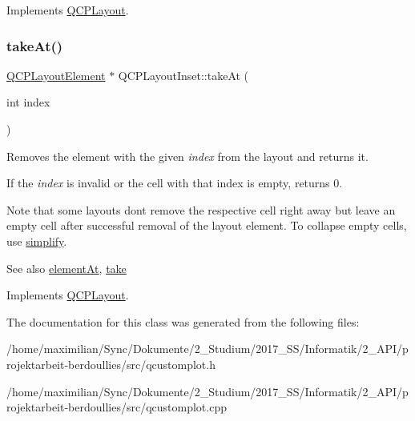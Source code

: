 Implements \hyperlink{class_q_c_p_layout_ada26cd17e56472b0b4d7fbbc96873e4c}{Q\+C\+P\+Layout}.

\mbox{\label{class_q_c_p_layout_inset_abf2e8233f5b7051220907e62ded490a2}} 
\subsubsection{\texorpdfstring{take\+At()}{takeAt()}}
{\footnotesize\ttfamily \hyperlink{class_q_c_p_layout_element}{Q\+C\+P\+Layout\+Element} $\ast$ Q\+C\+P\+Layout\+Inset\+::take\+At (\begin{DoxyParamCaption}\item[{int}]{index }\end{DoxyParamCaption})\hspace{0.3cm}{\ttfamily [virtual]}}

Removes the element with the given {\itshape index} from the layout and returns it.

If the {\itshape index} is invalid or the cell with that index is empty, returns 0.

Note that some layouts don\textquotesingle{}t remove the respective cell right away but leave an empty cell after successful removal of the layout element. To collapse empty cells, use \hyperlink{class_q_c_p_layout_inset_a18b7d508f0baa60cc5dcb1343cf7f32a}{simplify}.

\begin{DoxySeeAlso}{See also}
\hyperlink{class_q_c_p_layout_inset_a881ca205605bae9c034733b808f93a02}{element\+At}, \hyperlink{class_q_c_p_layout_inset_af7f13cc369f8190b5e7e17d5f39dfe1c}{take} 
\end{DoxySeeAlso}


Implements \hyperlink{class_q_c_p_layout_a5a79621fa0a6eabb8b520cfc04fb601a}{Q\+C\+P\+Layout}.



The documentation for this class was generated from the following files\+:\begin{DoxyCompactItemize}
\item 
/home/maximilian/\+Sync/\+Dokumente/2\+\_\+\+Studium/2017\+\_\+\+S\+S/\+Informatik/2\+\_\+\+A\+P\+I/projektarbeit-\/berdoullies/src/qcustomplot.\+h\item 
/home/maximilian/\+Sync/\+Dokumente/2\+\_\+\+Studium/2017\+\_\+\+S\+S/\+Informatik/2\+\_\+\+A\+P\+I/projektarbeit-\/berdoullies/src/qcustomplot.\+cpp\end{DoxyCompactItemize}
